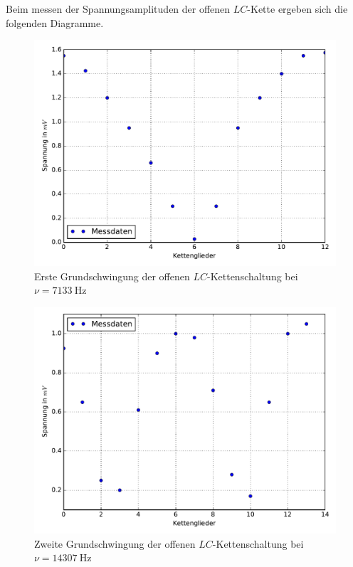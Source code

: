 Beim messen der Spannungsamplituden der offenen $LC$-Kette ergeben sich die folgenden
Diagramme.

\begin{figure}
  \includegraphics[width=\textwidth]{Messung_d_1.pdf}
  \caption{Erste Grundschwingung der offenen $LC$-Kettenschaltung bei $\nu = \SI{7133}{\hertz}$}
  \label{fig:Messungd1}
\end{figure}

\begin{figure}
  \includegraphics[width=\textwidth]{Messung_d_2.pdf}
  \caption{Zweite Grundschwingung der offenen $LC$-Kettenschaltung bei $\nu = \SI{14307}{\hertz}$}
  \label{fig:Messungd2}
\end{figure}

